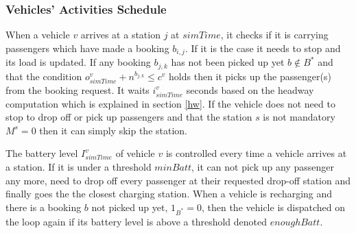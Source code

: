 \documentclass[12pt,a4paper]{article}
\begin{document}
\subsubsection{Vehicles' Activities Schedule}\label{schedule}
When a vehicle $v$ arrives at a station $j$ at $simTime$, it checks if it is carrying passengers which have made a booking $b_{i,j}$. If it is the case it needs to stop and its load is updated. If any booking $b_{j,k}$ has not been picked up yet $b \not\in B^{*}$ and that the condition $o^{v}_{simTime} + n^{b_{j,k}} \leq c^{v}$ holds then it picks up the passenger(s) from the booking request. It waits $i^{v}_{simTime}$ seconds based on the headway computation which is explained in section \ref{hw}. If the vehicle does not need to stop to drop off or pick up passengers and that the station $s$ is not mandatory $M^{s} = 0$ then it can simply skip the station.   

The battery level $I^{v}_{simTime}$ of vehicle $v$ is controlled every time a vehicle arrives at a station. If it is under a threshold $minBatt$, it can not pick up any passenger any more, need to drop off every passenger at their requested drop-off station and finally goes the the closest charging station. When a vehicle is recharging and there is a booking $b$ not picked up yet, $1_{B^{*}} = 0$, then the vehicle is dispatched on the loop again if its battery level is above a threshold denoted $enoughBatt$. 
\end{document}
